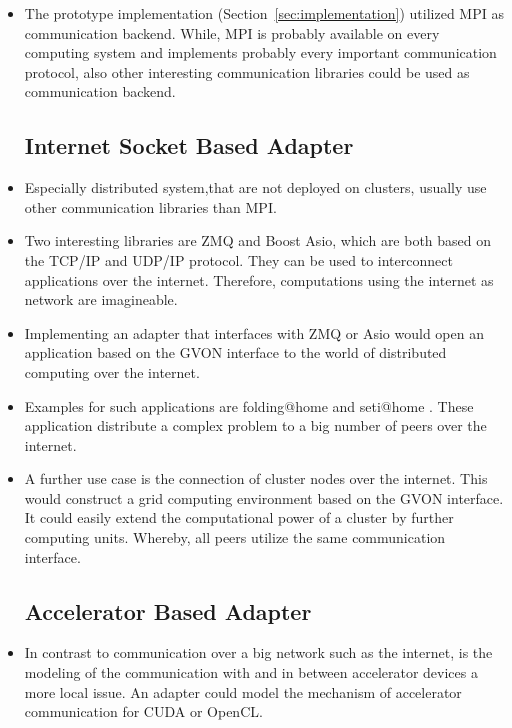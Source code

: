 \begin{itemize}
\item The prototype implementation (Section~\ref{sec:implementation})
  utilized MPI as communication backend. While, MPI is probably
  available on every computing system and implements probably every
  important communication protocol, also other interesting
  communication libraries could be used as communication backend.

\subsection*{Internet Socket Based Adapter}
\item Especially distributed system,that are not deployed on clusters,
  usually use other communication libraries than MPI.

\item Two interesting libraries are ZMQ and Boost Asio, which are
  both based on the TCP/IP and UDP/IP protocol. They can be used to
  interconnect applications over the internet. Therefore,
  computations using the internet as network are imagineable.

\item Implementing an adapter that interfaces with ZMQ or Asio would
  open an application based on the GVON interface to the world of
  distributed computing over the internet.
  
\item Examples for such applications are folding@home
  \cite{ref:folding_at_home} and seti@home
  \cite{ref:seti_at_home}. These application distribute a complex
  problem to a big number of peers over the internet.

\item A further use case is the connection of cluster nodes over the
  internet. This would construct a grid computing environment based on
  the GVON interface. It could easily extend the computational power
  of a cluster by further computing units. Whereby, all peers utilize
  the same communication interface.

\subsection*{Accelerator Based Adapter}
\item In contrast to communication over a big network such as the
  internet, is the modeling of the communication with and in between
  accelerator devices a more local issue. An adapter could model the
  mechanism of accelerator communication for CUDA or OpenCL.


\end{itemize}
